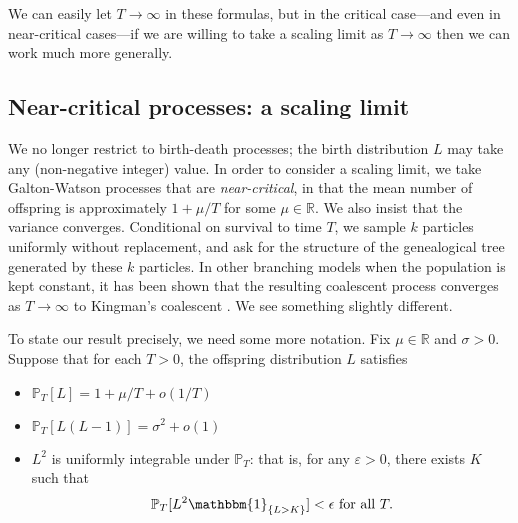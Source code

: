 \documentclass{article}
\theoremstyle{plain}
\theoremstyle{definition}
\renewcommand{\P}{\mathbb{P}}
\newcommand{\R}{\mathbb{R}}
\newcommand{\ind}{\mathbbm{1}}
\newcommand{\eps}{\varepsilon}
\begin{document}
We can easily let $T\to\infty$ in these formulas, but in the critical case---and even in near-critical cases---if we are willing to take a scaling limit as $T\to\infty$ then we can work much more generally.






\subsection{Near-critical processes: a scaling limit}\label{nearcritresultssec}

We no longer restrict to birth-death processes; the birth distribution $L$ may take any (non-negative integer) value. In order to consider a scaling limit, we take Galton-Watson processes that are \emph{near-critical}, in that the mean number of offspring is approximately $1+\mu/T$ for some $\mu\in\R$. We also insist that the variance converges. Conditional on survival to time $T$, we sample $k$ particles uniformly without replacement, and ask for the structure of the genealogical tree generated by these $k$ particles. In other branching models when the population is kept constant, it has been shown that the resulting coalescent process converges as $T\to\infty$ to Kingman's coalescent \cite{schweinsberg2003coalescent}. We see something slightly different.

To state our result precisely, we need some more notation. Fix $\mu \in \mathbb{R}$ and $\sigma>0$. Suppose that for each $T>0$, the offspring distribution $L$ satisfies
\begin{itemize}
\item $\P_T[L] = 1 + \mu/T + o(1/T)$
\item $\P_T[L (L - 1)] = \sigma^2 + o(1)$
\item $L^2$ is uniformly integrable under $\P_T$: that is, for any $\eps>0$, there exists $K$ such that
\[\P_T[L^2\ind_{\{L>K\}}]<\epsilon \text{ for all } T.\]
\end{itemize}
\end{document}
